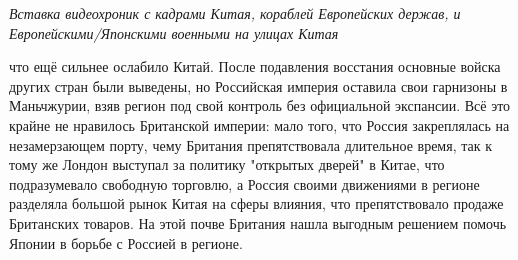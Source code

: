 \textit{Вставка видеохроник с кадрами Китая, кораблей Европейских держав, и Европейскими/Японскими военными на улицах Китая}

что ещё сильнее ослабило Китай. После подавления восстания основные войска других стран были выведены, но Российская империя оставила свои гарнизоны в Маньчжурии, взяв регион под свой контроль без официальной экспансии. Всё это крайне не нравилось Британской империи: мало того, что Россия закреплялась на незамерзающем порту, чему Британия препятствовала длительное время, так к тому же Лондон выступал за политику "открытых дверей" в Китае, что подразумевало свободную торговлю, а Россия своими движениями в регионе разделяла большой рынок Китая на сферы влияния, что препятствовало продаже Британских товаров. На этой почве Британия нашла выгодным решением помочь Японии в борьбе с Россией в регионе.